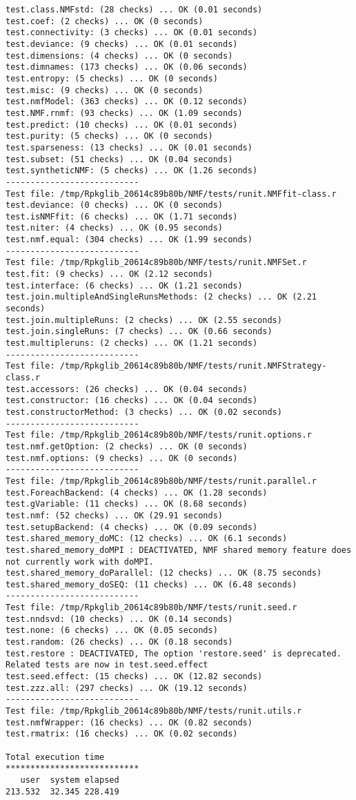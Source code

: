 \documentclass[10pt]{article}
\begin{document}
\begin{verbatim}
test.class.NMFstd: (28 checks) ... OK (0.01 seconds)
test.coef: (2 checks) ... OK (0 seconds)
test.connectivity: (3 checks) ... OK (0.01 seconds)
test.deviance: (9 checks) ... OK (0.01 seconds)
test.dimensions: (4 checks) ... OK (0 seconds)
test.dimnames: (173 checks) ... OK (0.06 seconds)
test.entropy: (5 checks) ... OK (0 seconds)
test.misc: (9 checks) ... OK (0 seconds)
test.nmfModel: (363 checks) ... OK (0.12 seconds)
test.NMF.rnmf: (93 checks) ... OK (1.09 seconds)
test.predict: (10 checks) ... OK (0.01 seconds)
test.purity: (5 checks) ... OK (0 seconds)
test.sparseness: (13 checks) ... OK (0.01 seconds)
test.subset: (51 checks) ... OK (0.04 seconds)
test.syntheticNMF: (5 checks) ... OK (1.26 seconds)
--------------------------- 
Test file: /tmp/Rpkglib_20614c89b80b/NMF/tests/runit.NMFfit-class.r 
test.deviance: (0 checks) ... OK (0 seconds)
test.isNMFfit: (6 checks) ... OK (1.71 seconds)
test.niter: (4 checks) ... OK (0.95 seconds)
test.nmf.equal: (304 checks) ... OK (1.99 seconds)
--------------------------- 
Test file: /tmp/Rpkglib_20614c89b80b/NMF/tests/runit.NMFSet.r 
test.fit: (9 checks) ... OK (2.12 seconds)
test.interface: (6 checks) ... OK (1.21 seconds)
test.join.multipleAndSingleRunsMethods: (2 checks) ... OK (2.21 seconds)
test.join.multipleRuns: (2 checks) ... OK (2.55 seconds)
test.join.singleRuns: (7 checks) ... OK (0.66 seconds)
test.multipleruns: (2 checks) ... OK (1.21 seconds)
--------------------------- 
Test file: /tmp/Rpkglib_20614c89b80b/NMF/tests/runit.NMFStrategy-class.r 
test.accessors: (26 checks) ... OK (0.04 seconds)
test.constructor: (16 checks) ... OK (0.04 seconds)
test.constructorMethod: (3 checks) ... OK (0.02 seconds)
--------------------------- 
Test file: /tmp/Rpkglib_20614c89b80b/NMF/tests/runit.options.r 
test.nmf.getOption: (2 checks) ... OK (0 seconds)
test.nmf.options: (9 checks) ... OK (0 seconds)
--------------------------- 
Test file: /tmp/Rpkglib_20614c89b80b/NMF/tests/runit.parallel.r 
test.ForeachBackend: (4 checks) ... OK (1.28 seconds)
test.gVariable: (11 checks) ... OK (8.68 seconds)
test.nmf: (52 checks) ... OK (29.91 seconds)
test.setupBackend: (4 checks) ... OK (0.09 seconds)
test.shared_memory_doMC: (12 checks) ... OK (6.1 seconds)
test.shared_memory_doMPI : DEACTIVATED, NMF shared memory feature does not currently work with doMPI.
test.shared_memory_doParallel: (12 checks) ... OK (8.75 seconds)
test.shared_memory_doSEQ: (11 checks) ... OK (6.48 seconds)
--------------------------- 
Test file: /tmp/Rpkglib_20614c89b80b/NMF/tests/runit.seed.r 
test.nndsvd: (10 checks) ... OK (0.14 seconds)
test.none: (6 checks) ... OK (0.05 seconds)
test.random: (26 checks) ... OK (0.18 seconds)
test.restore : DEACTIVATED, The option 'restore.seed' is deprecated. Related tests are now in test.seed.effect
test.seed.effect: (15 checks) ... OK (12.82 seconds)
test.zzz.all: (297 checks) ... OK (19.12 seconds)
--------------------------- 
Test file: /tmp/Rpkglib_20614c89b80b/NMF/tests/runit.utils.r 
test.nmfWrapper: (16 checks) ... OK (0.82 seconds)
test.rmatrix: (16 checks) ... OK (0.02 seconds)

Total execution time
***************************
   user  system elapsed 
213.532  32.345 228.419 

\end{verbatim}
\end{document}
